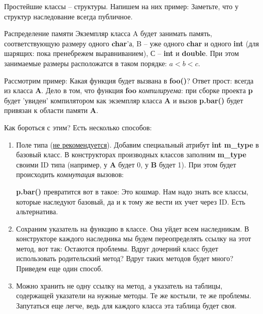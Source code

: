 \begin{lecture}[\lectureSubject]
	\begin{lecSection}
		Простейшие классы -- структуры. Напишем на них пример:
		Заметьте, что у структур наследование всегда публичное.
		
		\begin{lecSubsection}{Распределение памяти}
			Экземпляр класса A будет занимать память, соответствующую размеру одного \textbf{char}'а, B -- уже одного \textbf{char} и одного \textbf{int} (для шарящих: пока пренебрежем выравниванием), С -- \textbf{int} и \textbf{double}. При этом занимаемые размеры расположатся в таком порядке: $ a < b < c $.
		\end{lecSubsection}
	
		\begin{lecSection}
			Рассмотрим пример:
			Какая функция будет вызвана в \textbf{foo()}? Ответ прост: всегда из класса \textbf{A}. Дело в том, что функция \textbf{foo} \textit{компилируема}: при сборке проекта \textbf{p} будет 'увиден' компилятором как экземпляр класса \textbf{A} и вызов \textbf{p.bar()} будет привязан к области памяти \textbf{A}.
			
			Как бороться с этим? Есть несколько способов:
			\begin{enumerate}
				\item Поле типа (\underline{не рекомендуется}). Добавим специальный атрибут \textbf{int m\_type} в базовый класс. В конструкторах производных классов заполним \textbf{m\_type} своими ID типа (например, у \textbf{A} будет 0, у \textbf{B} будет 1). При этом будет происходить \textit{коммутация} вызовов:
				
				\textbf{p.bar()} превратится вот в такое:
				Это кошмар. Нам надо знать все классы, которые наследуют базовый, да и к тому же вести их учет через ID. Есть альтернатива.
				\item Сохраним указатель на функцию в классе. Она уйдет всем наследникам. В конструкторе каждого наследника мы будем переопределять ссылку на этот метод, вот так:
				Остаются проблемы. Вдруг дочерний класс будет использовать родительский метод? Вдруг таких методов будет много? Приведем еще один способ.
				
				\item \label{v3} Можно хранить не одну ссылку на метод, а указатель на таблицы, содержащей указатели на нужные методы. Те же костыли, те же проблемы. Запутаться еще легче, ведь для каждого класса эта таблица будет своя.
			\end{enumerate}
			

\end{lecSection}
\end{lecSection}
\end{lecture}
